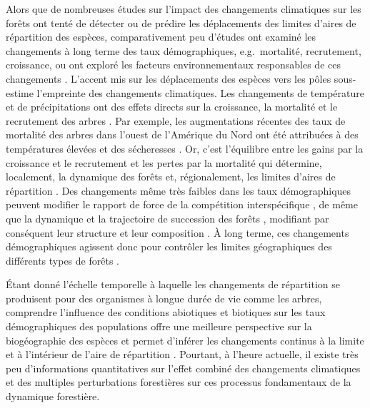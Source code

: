 Alors que de nombreuses études sur l'impact des changements climatiques
sur les forêts ont tenté de détecter ou de prédire les déplacements des
limites d'aires de répartition des espèces, comparativement peu d'études
ont examiné les changements à long terme des taux démographiques,
e.g.~mortalité, recrutement, croissance, ou ont exploré les facteurs
environnementaux responsables de ces changements \citep[reviewed
in][]{allen_global_2010}. L'accent mis sur les déplacements des espèces
vers les pôles sous-estime l'empreinte des changements climatiques. Les
changements de température et de précipitations ont des effets directs
sur la croissance, la mortalité et le recrutement des arbres
\citep{vanderwel_climate-related_2013, zhang_half-century_2015}. Par
exemple, les augmentations récentes des taux de mortalité des arbres
dans l'ouest de l'Amérique du Nord ont été attribuées à des températures
élevées et des sécheresses
\citep{van_mantgem_widespread_2009, peng_drought-induced_2011}. Or,
c'est l'équilibre entre les gains par la croissance et le recrutement et
les pertes par la mortalité qui détermine, localement, la dynamique des
forêts et, régionalement, les limites d'aires de répartition
\citep{holt_theoretical_2005}. Des changements même très faibles dans
les taux démographiques peuvent modifier le rapport de force de la
compétition interspécifique
\citep{luo_observations_2013, reich_geographic_2015}, de même que la
dynamique et la trajectoire de succession des forêts
\citep{prach_four_2011}, modifiant par conséquent leur structure et leur
composition \citep{van_mantgem_widespread_2009, stephenson_causes_2011}.
À long terme, ces changements démographiques agissent donc pour
contrôler les limites géographiques des différents types de forêts
\citep{holt_theoretical_2005}.

Étant donné l'échelle temporelle à laquelle les changements de
répartition se produisent pour des organismes à longue durée de vie
comme les arbres, comprendre l'influence des conditions abiotiques et
biotiques sur les taux démographiques des populations offre une
meilleure perspective sur la biogéographie des espèces et permet
d'inférer les changements continus à la limite et à l'intérieur de
l'aire de répartition
\citep{sexton_evolution_2009, schurr_how_2012, thuiller_road_2013, snell_using_2014}.
Pourtant, à l'heure actuelle, il existe très peu d'informations
quantitatives sur l'effet combiné des changements climatiques et des
multiples perturbations forestières sur ces processus fondamentaux de la
dynamique forestière.

